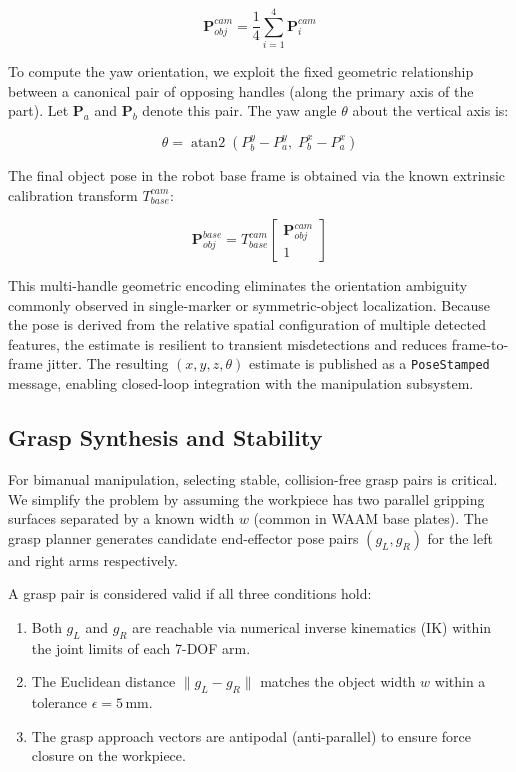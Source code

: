 \documentclass[letterpaper, 10 pt, conference]{ieeeconf}  %
\begin{document}
\begin{equation}
    \bm{P}_{obj}^{cam} = \frac{1}{4} \sum_{i=1}^{4} \bm{P}_i^{cam}
\end{equation}

To compute the yaw orientation, we exploit the fixed geometric relationship
between a canonical pair of opposing handles (along the primary axis of the
part). Let $\bm{P}_a$ and $\bm{P}_b$ denote this pair. The yaw angle
$\theta$ about the vertical axis is:

\begin{equation}
    \theta = \operatorname{atan2}\!\left(P_b^y - P_a^y,\; P_b^x - P_a^x\right)
\end{equation}

The final object pose in the robot base frame is obtained via the known
extrinsic calibration transform $T_{base}^{cam}$:

\begin{equation}
    \bm{P}_{obj}^{base} = T_{base}^{cam}
    \begin{bmatrix} \bm{P}_{obj}^{cam} \\ 1 \end{bmatrix}
\end{equation}

This multi-handle geometric encoding eliminates the orientation ambiguity
commonly observed in single-marker or symmetric-object localization. Because
the pose is derived from the relative spatial configuration of multiple
detected features, the estimate is resilient to transient misdetections and
reduces frame-to-frame jitter. The resulting $(x, y, z, \theta)$ estimate is
published as a \texttt{PoseStamped} message, enabling closed-loop integration
with the manipulation subsystem.

\subsection{Grasp Synthesis and Stability}

For bimanual manipulation, selecting stable, collision-free grasp pairs is
critical. We simplify the problem by assuming the workpiece has two parallel
gripping surfaces separated by a known width $w$ (common in WAAM base plates).
The grasp planner generates candidate end-effector pose pairs $(g_L, g_R)$
for the left and right arms respectively.

A grasp pair is considered valid if all three conditions hold:

\begin{enumerate}
    \item Both $g_L$ and $g_R$ are reachable via numerical inverse
    kinematics (IK) within the joint limits of each 7-DOF arm.
    \item The Euclidean distance $\|g_L - g_R\|$ matches the object
    width $w$ within a tolerance $\epsilon = 5$\,mm.
    \item The grasp approach vectors are antipodal (anti-parallel) to
    ensure force closure on the workpiece.
\end{enumerate}
\end{document}
